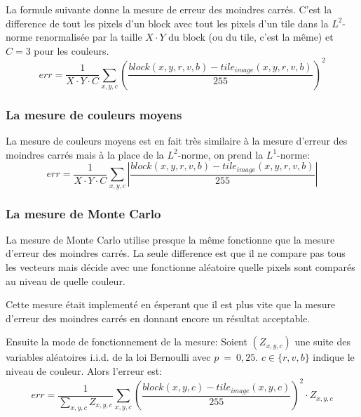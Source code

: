 \documentclass[a4paper]{article}
\begin{document}
La formule suivante donne la mesure de erreur des moindres carr\'es.
C'est la difference de tout les pixels d'un block avec tout les pixels d'un tile dans la $L^2$-norme renormalis\'ee par la taille $X\cdot Y$ du block (ou du tile, c'est la m\^eme) et $C=3$ pour les couleurs. 
\begin{equation}
err=\frac{1}{X\cdot Y\cdot C}\sum_{x,y,c}\left(\frac{block(x,y,r,v,b)-tile_{image}(x,y,r,v,b)}{255}\right)^2
\end{equation}
 
\subsubsection{La mesure de couleurs moyens}
La mesure de couleurs moyens est en fait tr\`es similaire \`a la mesure d'erreur des moindres carr\'es mais \`a la place de la $L^2$-norme, on prend la $L^1$-norme:
\begin{equation}
err=\frac{1}{X\cdot Y\cdot C}\sum_{x,y,c}\left|\frac{block(x,y,r,v,b)-tile_{image}(x,y,r,v,b)}{255}\right|
\end{equation}

\subsubsection{La mesure de Monte Carlo}
La mesure de Monte Carlo utilise presque la m\^eme fonctionne que la mesure d'erreur des moindres carr\'es.
La seule difference est que il ne compare pas tous les vecteurs mais d\'ecide avec une fonctionne al\'eatoire quelle pixels sont compar\'es au niveau de quelle couleur.

Cette mesure \'etait implement\'e en \'esperant que il est plus vite que la mesure d'erreur des moindres carr\'es en donnant encore un r\'esultat acceptable.

Ensuite la mode de fonctionnement de la mesure:
Soient $(Z_{x,y,c})$ une suite des variables al\'eatoires i.i.d. de la loi Bernoulli avec $p~=~0,25$.
$c\in \{r,v,b\}$ indique le niveau de couleur.
Alors l'erreur est:
\begin{equation}
err=\frac{1}{\sum_{x,y,c}Z_{x,y,c}}\sum_{x,y,c}\left(\frac{block(x,y,c)-tile_{image}(x,y,c)}{255}\right)^2\cdot Z_{x,y,c}
\end{equation}
\end{document}
